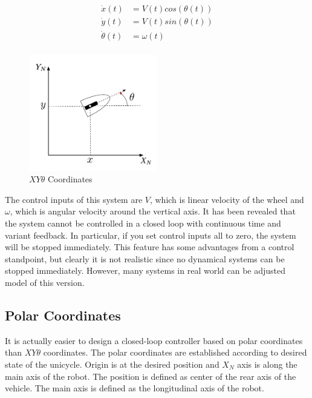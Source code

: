 \documentclass[twoside]{article}
\begin{document}
\begin{equation} \label{xytheta}
\begin{split}
\dot{x}(t) &= V(t) cos(\theta(t)) \\
\dot{y}(t) &= V(t) sin(\theta(t)) \\
\dot{\theta}(t) &= \omega(t)  \\
\end{split}
\end{equation}

\begin{figure}[h]
\centering
\includegraphics[width=0.5\textwidth]{XYTheta.png}
\caption{$XY\theta$ Coordinates}
\label{XYThetaFigure}
\end{figure}

The control inputs of this system are $V$, which is linear velocity of the wheel and $\omega$, which is angular velocity around the vertical axis. It has been revealed that the system cannot be controlled in a closed loop with continuous time and variant feedback. In particular, if you set control inputs all to zero, the system will be stopped immediately. This feature has some advantages from a control standpoint, but clearly it is not realistic since no dynamical systems can be stopped immediately. However, many systems in real world can be adjusted model of this version.

\subsection{Polar Coordinates}
It is actually easier to design a closed-loop controller based on polar coordinates than $XY\theta$ coordinates. The polar coordinates are established according to desired state of the unicycle. Origin is at the desired position and $X_N$ axis is along the main axis of the robot. The position is defined as center of the rear axis of the vehicle. The main axis is defined as the longitudinal axis of the robot. 
\end{document}
